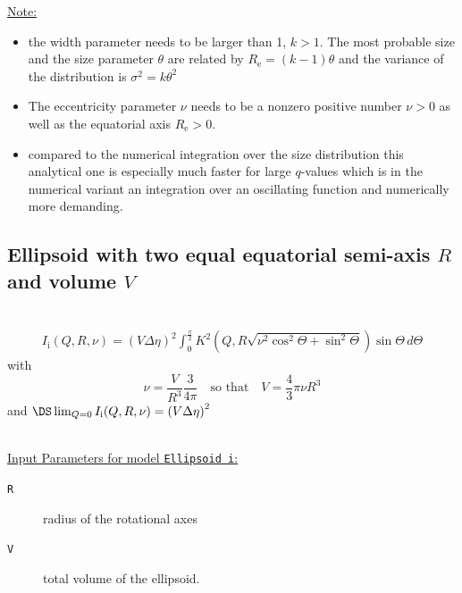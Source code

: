 \uline{Note:}
\begin{itemize}
\item the width parameter needs to be larger than 1, $k>1$. The most probable size and the size parameter $\theta$ are related by $R_\mathrm{e} = (k-1) \theta$ and the variance of the distribution is $\sigma^2 = k \theta^2$
\item The eccentricity parameter $\nu$ needs to be a nonzero positive number $\nu>0$ as well as the equatorial axis $R_\mathrm{e}>0$.
\item compared to the numerical integration over the size distribution this analytical one is especially much faster for large $q$-values which is in the numerical variant an integration over an oscillating function and numerically more demanding.
\end{itemize}

\clearpage
\subsection{Ellipsoid with two equal equatorial semi-axis $R$ and volume $V$}
\label{sect:Ellipsoid_i} ~\\

\begin{align}
I_\text{i}(Q,R,\nu) = \left( V \Delta\eta
\right)^2
 \int_0^{\frac{\pi}{2}}\! K^2\left(Q,R\sqrt{\nu^2\cos^2\Theta+\sin^2\Theta}\right)\sin\Theta\, d\Theta
\end{align}
with
$$
\nu=\frac{V}{R^3}\frac{3}{4\pi} \quad \mbox{so that}\quad V =\frac{4}{3}\pi\nu R^3
$$
and $\DS \lim_{Q=0} I_\text{i}(Q,R,\nu)= \left(V\Delta\eta\right)^2$

~\\
\uline{Input Parameters for model \texttt{Ellipsoid i}:}
\begin{description}
\item[\texttt{R}] radius of the rotational axes
\item[\texttt{V}] total volume of the ellipsoid.
\end{description}

